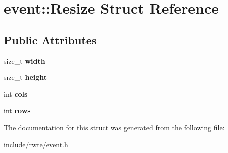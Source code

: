 \hypertarget{structevent_1_1Resize}{}\section{event\+::Resize Struct Reference}
\label{structevent_1_1Resize}
\subsection*{Public Attributes}
\begin{DoxyCompactItemize}
\item 
\mbox{\label{structevent_1_1Resize_a89bd98f04597c183a025b9b6d99ad3fc}} 
size\+\_\+t {\bfseries width}
\item 
\mbox{\label{structevent_1_1Resize_a8030f63b463c7bc22c9569e87cdd1036}} 
size\+\_\+t {\bfseries height}
\item 
\mbox{\label{structevent_1_1Resize_ae6660c84f5b11fe6765a13c19cc39cfd}} 
int {\bfseries cols}
\item 
\mbox{\label{structevent_1_1Resize_a0d0e2cfce4bdb70cb47e4dcb32fa885a}} 
int {\bfseries rows}
\end{DoxyCompactItemize}


The documentation for this struct was generated from the following file\+:\begin{DoxyCompactItemize}
\item 
include/rwte/event.\+h\end{DoxyCompactItemize}
